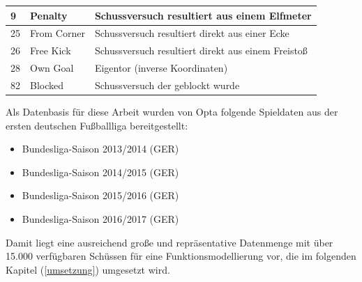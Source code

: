 \tablelasttail{}
\begin{center}%
\begin{supertabular}{ | P{2cm} | P{3cm} | P{5cm} |}
\vspace*{1mm}9 	& \vspace*{1mm}Penalty  	& 	Schussversuch resultiert aus einem Elfmeter\\
\hline
\vspace*{1mm}25	& \vspace*{1mm}From Corner  	& Schussversuch resultiert direkt aus einer Ecke 	\\
\hline
\vspace*{1mm}26	& \vspace*{1mm}Free Kick  	& Schussversuch resultiert direkt aus einem Freistoß  	\\
\hline
\vspace*{1mm}28	& \vspace*{1mm}Own Goal  	& Eigentor (inverse Koordinaten) 	\\
\hline
\vspace*{1mm}82	& \vspace*{1mm}Blocked  	& Schussversuch der geblockt wurde 	\\
\hline	
\end{supertabular}
\end{center}

Als Datenbasis für diese Arbeit wurden von Opta folgende Spieldaten aus der ersten deutschen Fußballliga bereitgestellt:

\begin{itemize}
\item Bundesliga-Saison 2013/2014 (GER)
\item Bundesliga-Saison 2014/2015 (GER)
\item Bundesliga-Saison 2015/2016 (GER)
\item Bundesliga-Saison 2016/2017 (GER)
\end{itemize}

Damit liegt eine ausreichend große und repräsentative Datenmenge mit über 15.000 verfügbaren Schüssen für eine Funktionsmodellierung vor, die im folgenden Kapitel (\vref{umsetzung}) umgesetzt wird.

